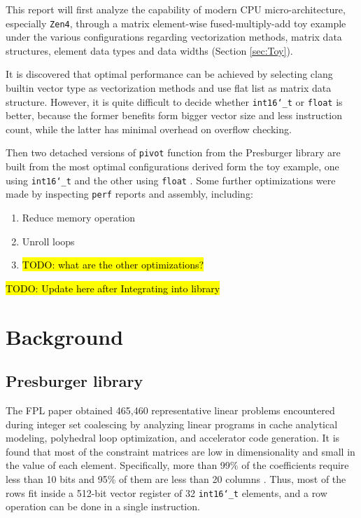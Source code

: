 \documentclass[logo,bsc,singlespacing,parskip]{infthesis}
\newcommand{\dtshort}{\texttt{int16\char`_t} }
\newcommand{\dtfloat}{\texttt{float} }
\newenvironment{compactlist}
{ \begin{enumerate}
    \setlength{\itemsep}{0pt}
    \setlength{\parskip}{0pt}
    \setlength{\parsep}{0pt}     
}
{ \end{enumerate} }
\begin{document}
This report will first analyze the capability of modern CPU micro-architecture,
especially \texttt{Zen4}, through a matrix element-wise fused-multiply-add toy
example under the various configurations regarding vectorization methods, matrix
data structures, element data types and data widths (Section \ref{sec:Toy}). 

It is discovered that optimal performance can be achieved by selecting clang
builtin vector type as vectorization methods and use flat list as matrix data
structure. However, it is quite difficult to decide whether \dtshort or
\dtfloat is better, because the former benefits form bigger vector size
and less instruction count, while the latter has minimal overhead on overflow
checking. 

Then two detached versions of \texttt{pivot} function from the Presburger
library are built from the most optimal configurations derived form the toy
example, one using \dtshort and the other using \dtfloat. Some
further optimizations were made by inspecting \texttt{perf} reports and
assembly, including: 

\begin{compactlist} 
    \item Reduce memory operation
    \item Unroll loops
    \item\hl{TODO: what are the other optimizations?}
\end{compactlist}

\hl{TODO: Update here after Integrating into library}



\chapter{Background}
\section{Presburger library}

The FPL paper obtained 465,460 representative linear problems encountered during
integer set coalescing by analyzing linear programs in cache analytical
modeling, polyhedral loop optimization, and accelerator code generation. It is
found that most of the constraint matrices are low in dimensionality and small
in the value of each element. Specifically, more than 99\% of the coefficients
require less than 10 bits and 95\% of them are less than 20 columns \cite{FPL1}.
Thus, most of the rows fit inside a 512-bit vector register of 32
\dtshort elements, and a row operation can be done in a single
instruction. 
\end{document}

